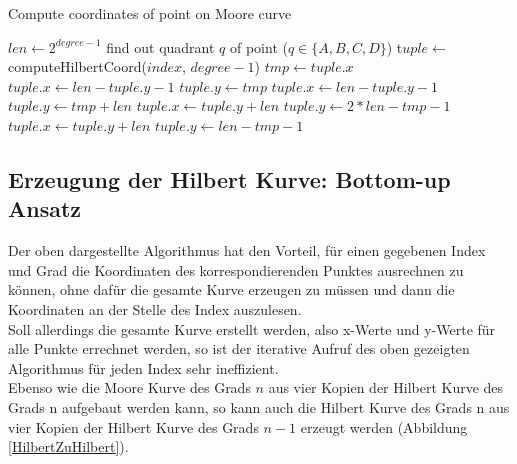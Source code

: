 \documentclass[course=erap]{aspdoc}
\begin{document}
\begin{algorithm}[H]
\begin{algorithmic}
\caption{Compute coordinates of point on Moore curve}
\label{moore:iterative}
	\State $len \leftarrow 2^{degree -1}$ 
	\State find out quadrant $q$ of point ($q \in \{A, B, C, D\}$)
	\State t$uple \leftarrow$ computeHilbertCoord($index$, $degree-1$)
	\State $tmp \leftarrow tuple.x$
		\State $tuple.x \leftarrow len - tuple.y - 1$
		\State $tuple.y \leftarrow tmp$
		\State $tuple.x \leftarrow len - tuple.y - 1$
		\State $tuple.y \leftarrow tmp + len$
		\State $tuple.x \leftarrow tuple.y + len$
		\State $tuple.y \leftarrow 2*len - tmp -1$
		\State $tuple.x \leftarrow tuple.y + len$
		\State $tuple.y \leftarrow len - tmp -1$
	\EndIf
\EndFunction
{}
	\State [...]
\EndFunction
\end{algorithmic}
\end{algorithm}








\subsection{Erzeugung der Hilbert Kurve: Bottom-up Ansatz}
Der oben dargestellte Algorithmus hat den Vorteil, für einen gegebenen Index und Grad die Koordinaten des korrespondierenden Punktes ausrechnen zu können, ohne dafür die gesamte Kurve erzeugen zu müssen und dann die Koordinaten an der Stelle des Index auszulesen.\\ 
Soll allerdings die gesamte Kurve erstellt werden, also x-Werte und y-Werte für alle Punkte errechnet werden, so ist der iterative Aufruf des oben gezeigten Algorithmus für jeden Index sehr ineffizient.\\
Ebenso wie die Moore Kurve des Grads $n$ aus vier Kopien der Hilbert Kurve des Grads n aufgebaut werden kann, so kann auch die Hilbert Kurve des Grads n aus vier Kopien der Hilbert Kurve des Grads $n-1$ erzeugt werden (Abbildung \ref{HilbertZuHilbert}).
\end{document}
